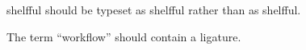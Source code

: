 \documentclass[english]{article}
\begin{document}
shelfful should be typeset as shelf\/ful rather than as shel{ff}ul.

The term ``workflow'' should contain a ligature.
\end{document}
